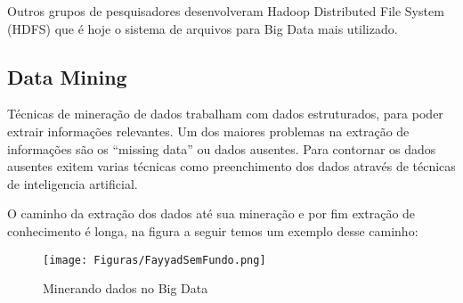 \documentclass[conference,compsoc]{IEEEtran}
\begin{document}
Outros grupos de pesquisadores desenvolveram Hadoop Distributed File System (HDFS) que é hoje o sistema de arquivos para Big Data mais utilizado.\cite{Lange2015}




\subsection{Data Mining}

Técnicas de mineração de dados trabalham com dados estruturados, para poder extrair informações relevantes.
Um dos maiores problemas na extração de informações são os ``missing data'' ou dados ausentes. Para contornar os dados ausentes exitem varias técnicas como preenchimento dos dados através de técnicas de inteligencia artificial.

O caminho da extração dos dados até sua mineração e por fim extração de conhecimento é longa, na figura a seguir temos um exemplo desse caminho:

\begin{figure}[!ht]
\centering
\caption{Minerando dados no Big Data}
\flushleft
\texttt{[image: Figuras/FayyadSemFundo.png]}
\end{figure}
\end{document}
